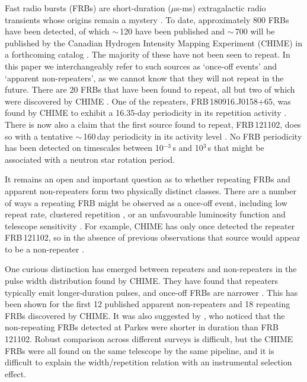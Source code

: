 \documentclass[fleqn,usenatbib]{mnras}
\begin{document}
Fast radio bursts (FRBs) are short-duration ($\mu$s-ms) extragalactic radio transients 
whose origins remain a mystery \citep{cordes2019, petroff_review}. 
To date, approximately 800 FRBs have been detected, 
of which $\sim$\,120 have been published \citep{petrofffrbcat} 
and $\sim$\,700 will be published by the Canadian Hydrogen Intensity Mapping 
Experiment (CHIME) in a forthcoming catalog \citep{fonseca-2020-apj}.
The majority of these have not been seen to repeat. In this paper 
we interchangeably refer to such sources as 
`once-off events' and `apparent non-repeaters', as we cannot 
know that they will not repeat in the future.
There are 20 FRBs that have been found to repeat, all but two of which 
were discovered by CHIME
\citep{spitler2016, chime2019r2, chime19-8repeaters, fonseca-2020-apj, Kumar-2019}.
One of the repeaters, 
FRB\,180916.J0158+65, was found by CHIME to exhibit a 16.35-day periodicity in its 
repetition activity \citep{chime-2020-periodicity}. There is now also a claim 
that the first source found to repeat, FRB\,121102, does so with a tentative $\sim$\,160\,day 
periodicity in its activity level \citep{rajwade-2020}. No FRB periodicity has been detected on 
timescales between 10$^{-3}$\,s and 10$^{3}$\,s that might be associated with 
a neutron star rotation period. 

It remains an open and important question as to whether repeating 
FRBs and apparent non-repeaters form two physically distinct classes. There are 
a number of ways a repeating FRB might be observed as a once-off event, 
including low repeat rate, 
clustered repetition \citep{scholz-2016, connor-2016b, oppermann-2018}, 
or an unfavourable 
luminosity function and telescope sensitivity \citep{connor-2018a,caleb-2019, Kumar-2019}. 
For example, CHIME has only once detected 
the repeater FRB\,121102, so in the absence of previous observations that 
source would appear to be a non-repeater \citep{josephy-2019}.

One curious distinction has emerged between repeaters and non-repeaters 
in the pulse width distribution found by CHIME. They have found that 
repeaters typically emit longer-duration pulses, and once-off FRBs are narrower \citep{chime19-8repeaters, fonseca-2020-apj}. This has been shown  
for the first 12 published apparent non-repeaters \citep{chime2019a} 
and 18 repeating FRBs discovered by CHIME. It was also suggested by 
\citet{scholz-2016}, who noticed that the non-repeating FRBs detected 
at Parkes were shorter in duration than FRB\,121102. Robust comparison 
across different surveys is difficult, but the CHIME FRBs were all 
found on the same telescope by the same pipeline, and it is difficult 
to explain the width/repetition relation with an instrumental selection effect.
\end{document}
